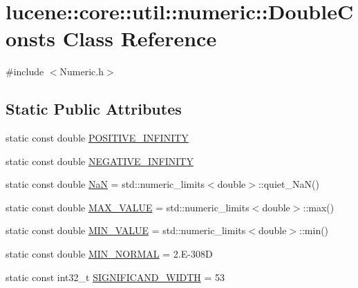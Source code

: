 \hypertarget{classlucene_1_1core_1_1util_1_1numeric_1_1DoubleConsts}{}\section{lucene\+:\+:core\+:\+:util\+:\+:numeric\+:\+:Double\+Consts Class Reference}
\label{classlucene_1_1core_1_1util_1_1numeric_1_1DoubleConsts}


{\ttfamily \#include $<$Numeric.\+h$>$}

\subsection*{Static Public Attributes}
\begin{DoxyCompactItemize}
\item 
static const double \mbox{\hyperlink{classlucene_1_1core_1_1util_1_1numeric_1_1DoubleConsts_ab0bdae992f5d0fe5b7777939cf538913}{P\+O\+S\+I\+T\+I\+V\+E\+\_\+\+I\+N\+F\+I\+N\+I\+TY}}
\item 
static const double \mbox{\hyperlink{classlucene_1_1core_1_1util_1_1numeric_1_1DoubleConsts_a9d874110cbfbb96c557de6fc06790c74}{N\+E\+G\+A\+T\+I\+V\+E\+\_\+\+I\+N\+F\+I\+N\+I\+TY}}
\item 
static const double \mbox{\hyperlink{classlucene_1_1core_1_1util_1_1numeric_1_1DoubleConsts_a7fe163af563d638bea6d4d226739ddab}{NaN}} = std\+::numeric\+\_\+limits$<$double$>$\+::quiet\+\_\+\+NaN()
\item 
static const double \mbox{\hyperlink{classlucene_1_1core_1_1util_1_1numeric_1_1DoubleConsts_a0e64f4e91ba2447a8f89a6d7ec75428d}{M\+A\+X\+\_\+\+V\+A\+L\+UE}} = std\+::numeric\+\_\+limits$<$double$>$\+::max()
\item 
static const double \mbox{\hyperlink{classlucene_1_1core_1_1util_1_1numeric_1_1DoubleConsts_aba5dd5bfeb948a635f25351eb1dc1c9c}{M\+I\+N\+\_\+\+V\+A\+L\+UE}} = std\+::numeric\+\_\+limits$<$double$>$\+::min()
\item 
static const double \mbox{\hyperlink{classlucene_1_1core_1_1util_1_1numeric_1_1DoubleConsts_acb2966fdb406ca24e5fd59c27838584a}{M\+I\+N\+\_\+\+N\+O\+R\+M\+AL}} = 2.\+E-\/308D
\item 
static const int32\+\_\+t \mbox{\hyperlink{classlucene_1_1core_1_1util_1_1numeric_1_1DoubleConsts_a90d448bae70d1db2c007295872d25b8f}{S\+I\+G\+N\+I\+F\+I\+C\+A\+N\+D\+\_\+\+W\+I\+D\+TH}} = 53
\item 

\end{DoxyCompactItemize}
